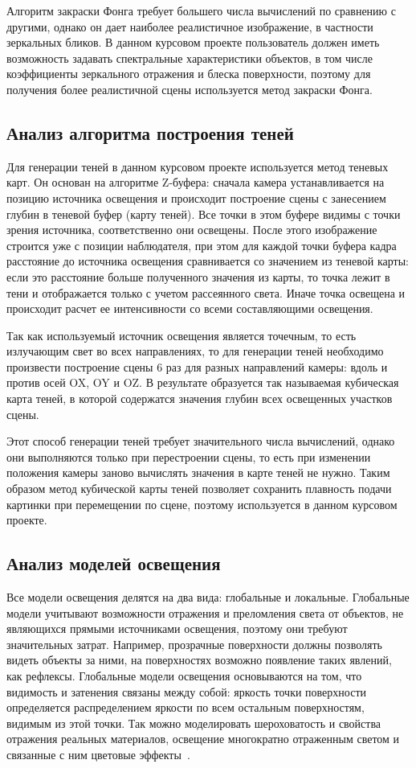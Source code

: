 Алгоритм закраски Фонга требует большего числа вычислений по сравнению с другими, однако он дает наиболее реалистичное изображение, в частности зеркальных бликов. В данном курсовом проекте пользователь должен иметь возможность задавать спектральные характеристики объектов, в том числе коэффициенты зеркального отражения и блеска поверхности, поэтому для получения более реалистичной сцены используется метод закраски Фонга.

\subsection{Анализ алгоритма построения теней}

Для генерации теней в данном курсовом проекте используется метод теневых карт. 
Он основан на алгоритме Z-буфера: сначала камера устанавливается на позицию источника освещения и происходит построение сцены с занесением глубин в теневой буфер (карту теней). 
Все точки в этом буфере видимы с точки зрения источника, соответственно они освещены. 
После этого изображение строится уже с позиции наблюдателя, при этом для каждой точки буфера кадра расстояние до источника освещения сравнивается со значением из теневой карты: если это расстояние больше полученного значения из карты, то точка лежит в тени и отображается только с учетом рассеянного света. Иначе точка освещена и происходит расчет ее интенсивности со всеми составляющими освещения. 

Так как используемый источник освещения является точечным, то есть излучающим свет во всех направлениях, то для генерации теней необходимо произвести построение сцены 6 раз для разных направлений камеры: вдоль и против осей OX, OY и OZ. В результате образуется так называемая кубическая карта теней, в которой содержатся значения глубин всех освещенных участков сцены. 

Этот способ генерации теней требует значительного числа вычислений, однако они выполняются только при перестроении сцены, то есть при изменении положения камеры заново вычислять значения в карте теней не нужно. Таким образом метод кубической карты теней позволяет сохранить плавность подачи картинки при перемещении по сцене, поэтому используется в данном курсовом проекте.

\subsection{Анализ моделей освещения}

Все модели освещения делятся на два вида: глобальные и локальные. 
Глобальные модели учитывают возможности отражения и преломления света от объектов, не являющихся прямыми источниками освещения, поэтому они требуют значительных затрат.
Например, прозрачные поверхности должны позволять видеть объекты за ними, на поверхностях возможно появление таких явлений, как
рефлексы.
Глобальные модели освещения основываются на том, что видимость и затенения связаны между собой: яркость точки поверхности определяется распределением яркости по всем остальным поверхностям, видимым из этой точки. 
Так можно моделировать шероховатость и свойства отражения реальных материалов, освещение многократно отраженным светом и связанные с ним цветовые эффекты~\cite{light-model}.


